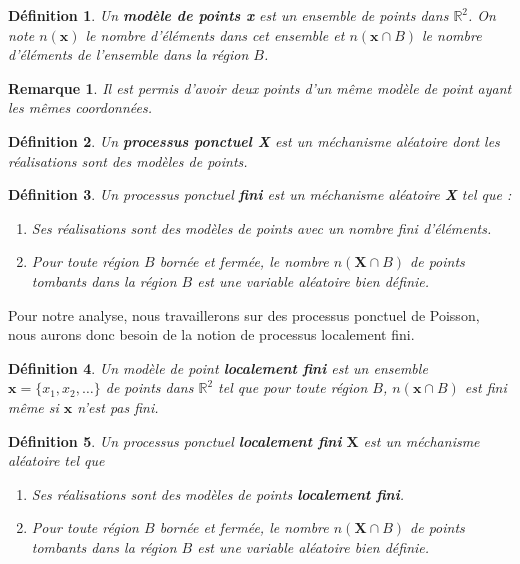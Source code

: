 \documentclass[12pt]{article}
\newcommand{\R}{\mathbb{R}}
\newtheorem*{rmq1}{Remarque}
\newtheorem*{defin1}{Définition}
\begin{document}
\begin{defin1}
Un \textbf{modèle de points x} est un ensemble de points dans $\R^2$. On note $n(\textbf{x})$ le nombre d'éléments dans cet ensemble et $n(\textbf{x}\cap B)$ le nombre d'éléments de l'ensemble dans la région $B$.
\end{defin1}

\begin{rmq1}
Il est permis d'avoir deux points d'un même modèle de point ayant les mêmes coordonnées.
\end{rmq1}

\begin{defin1}
Un \textbf{processus ponctuel X} est un méchanisme aléatoire dont les réalisations sont des modèles de points.
\end{defin1}

\begin{defin1}
Un processus ponctuel \textbf{fini} est un méchanisme aléatoire \textbf{X} tel que :
\begin{enumerate}
    \item Ses réalisations sont des modèles de points avec un nombre fini d'éléments.
    \item Pour toute région $B$ bornée et fermée, le nombre $n(\textbf{X}\cap B)$ de points tombants dans la région $B$ est une variable aléatoire bien définie.
\end{enumerate}
\end{defin1}
Pour notre analyse, nous travaillerons sur des processus ponctuel de Poisson, nous aurons donc besoin de la notion de processus localement fini.

\begin{defin1}
Un modèle de point \textbf{localement fini} est un ensemble $\textbf{x} = \{x_1,x_2,\dots\}$ de points dans $\R^2$ tel que pour toute région $B$, $n(\textbf{x}\cap B)$ est fini même si $\textbf{x}$ n'est pas fini.
\end{defin1}

\begin{defin1}
Un processus ponctuel \textbf{localement fini} $\textbf{X}$ est un méchanisme aléatoire tel que
\begin{enumerate}
    \item Ses réalisations sont des modèles de points \textbf{localement fini}.
    \item Pour toute région $B$ bornée et fermée, le nombre $n(\textbf{X}\cap B)$ de points tombants dans la région $B$ est une variable aléatoire bien définie.
\end{enumerate}
\end{defin1}
\end{document}
